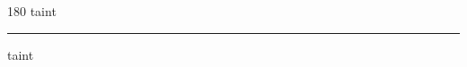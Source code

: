 
\begin{frame}
\begin{center}
\begin{turn}{180}
{\fontsize{2.5cm}{1em}\selectfont taint}
\end{turn}
\vspace{1em}\par  
\hrule
\vspace{1em}\par  
{\fontsize{2.5cm}{1em}\selectfont taint}
\end{center}
\end{frame}
